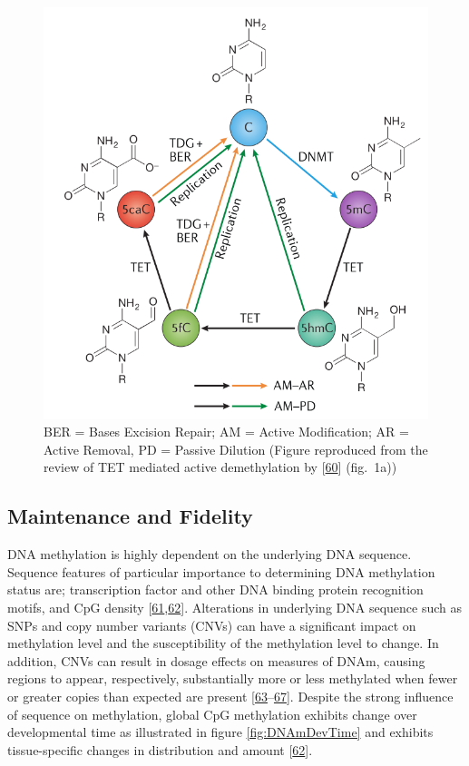 \documentclass[
]{book}
\begin{document}
\begin{figure}

{\centering \includegraphics[width=0.6\linewidth]{figs/Wu2017TETsDNAmCycle} 

}

\caption{BER = Bases Excision Repair; AM = Active Modification; AR = Active Removal, PD = Passive Dilution (Figure reproduced from the review of TET mediated active demethylation by {[}\protect\hyperlink{ref-Wu2017}{60}{]} (fig.~1a))}\label{fig:Wu2017TETsDNAmCycle}
\end{figure}



\hypertarget{maintenance-and-fidelity}{%
\subsection{Maintenance and Fidelity}\label{maintenance-and-fidelity}}

DNA methylation is highly dependent on the underlying DNA sequence.
Sequence features of particular importance to determining DNA methylation status are; transcription factor and other DNA binding protein recognition motifs, and CpG density {[}\protect\hyperlink{ref-Lienert2011}{61},\protect\hyperlink{ref-Ziller2013}{62}{]}.
Alterations in underlying DNA sequence such as SNPs and copy number variants (CNVs) can have a significant impact on methylation level and the susceptibility of the methylation level to change.
In addition, CNVs can result in dosage effects on measures of DNAm, causing regions to appear, respectively, substantially more or less methylated when fewer or greater copies than expected are present {[}\protect\hyperlink{ref-Boks2009}{63}--\protect\hyperlink{ref-Bell2017a}{67}{]}.
Despite the strong influence of sequence on methylation, global CpG methylation exhibits change over developmental time as illustrated in figure \ref{fig:DNAmDevTime} and exhibits tissue-specific changes in distribution and amount {[}\protect\hyperlink{ref-Ziller2013}{62}{]}.
\end{document}
